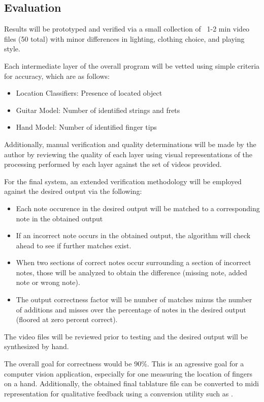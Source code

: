 \subsection{Evaluation}
Results will be prototyped and verified via a small collection of ~1-2 min video files
(50 total) with minor differences in lighting, clothing choice, and playing style.
\par
Each intermediate layer of the overall program will be vetted using simple criteria
for accuracy, which are as follows:
\begin{itemize}
    \item Location Classifiers: Presence of located object
    \item Guitar Model: Number of identified strings and frets
    \item Hand Model: Number of identified finger tips
\end{itemize}
Additionally, manual verification and quality determinations will be made by the author by reviewing
the quality of each layer using visual representations of the processing performed by each layer against the
set of videos provided.
\par
For the final system, an extended verification methodology will be employed against the desired output via the following:
\begin{itemize}
    \item Each note occurence in the desired output will be matched to a corresponding note in the obtained output
    \item If an incorrect note occurs in the obtained output, the algorithm will check ahead to see if further
        matches exist.
    \item When two sections of correct notes occur surrounding a section of incorrect notes, those will
        be analyzed to obtain the difference (missing note, added note or wrong note).
    \item The output correctness factor will be number of matches minus the number of additions and misses
        over the percentage of notes in the desired output (floored at zero percent correct).
\end{itemize}
The video files will be reviewed prior to testing and the desired output will be synthesized by hand.
\par
The overall goal for correctness would be 90\%.
This is an agressive goal for a computer vision application,
especially for one measuring the location of fingers on a hand.
Additionally, the obtained final tablature file can be converted to midi representation
for qualitative feedback using a conversion utility such as \cite{8notes}.
